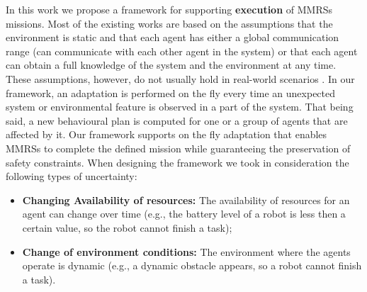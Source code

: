 \documentclass[journal]{IEEEtran}
\theoremstyle{definition}
\newcommand\patrizio[1]{\nb{Patrizio}{#1}}
\begin{document}
\patrizio{missing a figure here}
In this work we propose a framework for supporting \textbf{execution} of MMRSs missions. 
Most of the existing works are based on the assumptions that the environment is static and that each agent has either a global communication range (can communicate with each other agent in the system) or that each agent can obtain a full knowledge of the system and the environment at any time. These
assumptions, however, do not usually hold in real-world scenarios \cite{lahijanian2016iterative}.
In our framework, an adaptation is performed on the fly every time an unexpected system or environmental feature is observed in a part of the system. That being said, a new behavioural plan is computed for one or a group of agents that are affected by it. Our framework supports on the fly adaptation that enables MMRSs to complete the defined mission while guaranteeing the preservation of safety constraints.
When designing the framework we took in consideration the following types of uncertainty:
\begin{itemize}
\item \textbf{Changing Availability of resources:} The availability of resources for an agent can change over time (e.g., the battery level of a robot is less then a certain value, so the robot cannot finish a task);
\item \textbf{Change of environment conditions:} The environment where the agents operate is dynamic (e.g., a dynamic obstacle appears, so a robot cannot finish a task).
\end{itemize}
\end{document}
